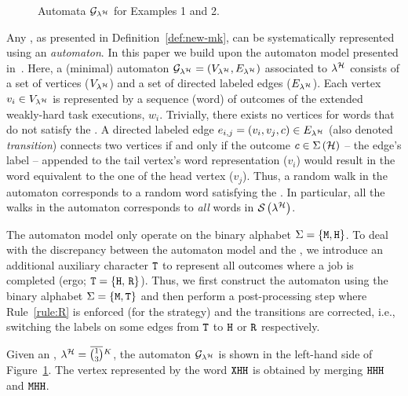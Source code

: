 \begin{figure}[t]
    \caption{Automata $\mathcal{G}_{\lambda^{\mathcal{H}}}$ for Examples 1 and 2.}
    \label{fig:min-graph}
\end{figure}
%
Any \ewhc{}, as presented in Definition~\ref{def:new-mk}, can be systematically represented using an \emph{automaton}.
In this paper we build upon the \tool{} automaton model presented in~{\cite{Vreman:2022}}.
Here, a (minimal) automaton $\mathcal{G}_{\lambda^{\mathcal{H}}} = \left(V_{\lambda^{\mathcal{H}}}, E_{\lambda^{\mathcal{H}}}\right)$ associated to $\lambda^{\mathcal{H}}$ consists of a set of vertices ($V_{\lambda^{\mathcal{H}}}$) and a set of directed labeled edges ($E_{\lambda^{\mathcal{H}}}$). 
Each vertex $v_i \in V_{\lambda^{\mathcal{H}}}$ is represented by a sequence (word) of outcomes of the extended weakly-hard task executions, $w_i$. 
Trivially, there exists no vertices for words that do not satisfy the \ewhc{}.
A directed labeled edge $e_{i, j} = \left(v_i, v_j, c \right) \in E_{\lambda^{\mathcal{H}}}$ (also denoted \emph{transition}) connects two vertices if and only if the outcome $c \in \Sigma\left(\mathcal{H}\right)$ -- the edge's label -- appended to the tail vertex's word representation ($v_i$) would result in the word equivalent to the one of the head vertex ($v_j$).
Thus, a random walk in the automaton corresponds to a random word satisfying the \ewhc{}.
In particular, all the walks in the automaton corresponds to \emph{all} words in $\mathcal{S}_{}\left( \lambda^{\mathcal{H}} \right)$.

The \tool{} automaton model only operate on the binary alphabet $\Sigma = \left\{\texttt{M}, \texttt{H}\right\}$. 
To deal with the discrepancy between the \tool{} automaton model and the \ewhc{}, we introduce an additional auxiliary character $\texttt{T}$ to represent all outcomes where a job is completed (ergo; $\texttt{T} = \left\{ \texttt{H},\, \texttt{R} \right\}$).
Thus, we first construct the automaton using the binary alphabet $\Sigma = \{\texttt{M}, \texttt{T}\}$ and then perform a post-processing step where Rule~\ref{rule:R} is enforced (for the \tS{} strategy) and the transitions are corrected, i.e., switching the labels on some edges from $\texttt{T}$ to $\texttt{H}$ or $\texttt{R}$ respectively. 

\begin{example}%
    \label{ex:auto-kill}%
    Given an \ewhc{}, $\lambda^{\strat} = \overbar{\binom{1}{3}}^{K}$, the automaton $\mathcal{G}_{\lambda^{\mathcal{H}}}$ is shown in the left-hand side of Figure~\ref{fig:min-graph}.
    The vertex represented by the word $\texttt{X}\texttt{H}\texttt{H}$ is obtained by merging $\texttt{H}\texttt{H}\texttt{H}$ and $\texttt{M}\texttt{H}\texttt{H}$.
\end{example}

